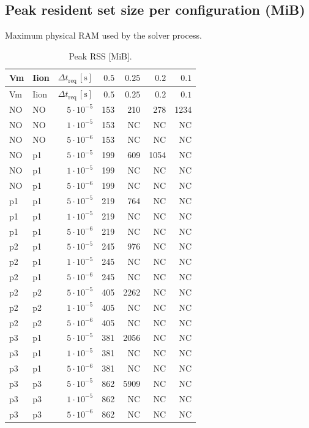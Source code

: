 \documentclass[11pt,a4paper]{article}
\begin{document}
\subsection{Peak resident set size per configuration (MiB)}
Maximum physical RAM used by the solver process.
\begin{center}\footnotesize
\begin{longtable}{llrrrrr}
\caption{Peak RSS [MiB].}\\
\toprule
Vm & Iion & $\Delta t_{\text{req}}\,[\text{s}]$ & $0.5$ & $0.25$ & $0.2$ & $0.1$\\
\midrule\endfirsthead\toprule
Vm & Iion & $\Delta t_{\text{req}}\,[\text{s}]$ & $0.5$ & $0.25$ & $0.2$ & $0.1$\\
\midrule\endhead
NO & NO & $5\!\cdot\!10^{-5}$ & 153 & 210 & 278 & 1234 \\
NO & NO & $1\!\cdot\!10^{-5}$ & 153 & NC & NC & NC \\
NO & NO & $5\!\cdot\!10^{-6}$ & 153 & NC & NC & NC \\\hline
NO & p1 & $5\!\cdot\!10^{-5}$ & 199 & 609 & 1054 & NC \\
NO & p1 & $1\!\cdot\!10^{-5}$ & 199 & NC & NC & NC \\
NO & p1 & $5\!\cdot\!10^{-6}$ & 199 & NC & NC & NC \\\hline
p1 & p1 & $5\!\cdot\!10^{-5}$ & 219 & 764 & NC & NC \\
p1 & p1 & $1\!\cdot\!10^{-5}$ & 219 & NC & NC & NC \\
p1 & p1 & $5\!\cdot\!10^{-6}$ & 219 & NC & NC & NC \\\hline
p2 & p1 & $5\!\cdot\!10^{-5}$ & 245 & 976 & NC & NC \\
p2 & p1 & $1\!\cdot\!10^{-5}$ & 245 & NC & NC & NC \\
p2 & p1 & $5\!\cdot\!10^{-6}$ & 245 & NC & NC & NC \\\hline
p2 & p2 & $5\!\cdot\!10^{-5}$ & 405 & 2262 & NC & NC \\
p2 & p2 & $1\!\cdot\!10^{-5}$ & 405 & NC & NC & NC \\
p2 & p2 & $5\!\cdot\!10^{-6}$ & 405 & NC & NC & NC \\\hline
p3 & p1 & $5\!\cdot\!10^{-5}$ & 381 & 2056 & NC & NC \\
p3 & p1 & $1\!\cdot\!10^{-5}$ & 381 & NC & NC & NC \\
p3 & p1 & $5\!\cdot\!10^{-6}$ & 381 & NC & NC & NC \\\hline
p3 & p3 & $5\!\cdot\!10^{-5}$ & 862 & 5909 & NC & NC \\
p3 & p3 & $1\!\cdot\!10^{-5}$ & 862 & NC & NC & NC \\
p3 & p3 & $5\!\cdot\!10^{-6}$ & 862 & NC & NC & NC \\
\bottomrule\end{longtable}\end{center}
\end{document}
